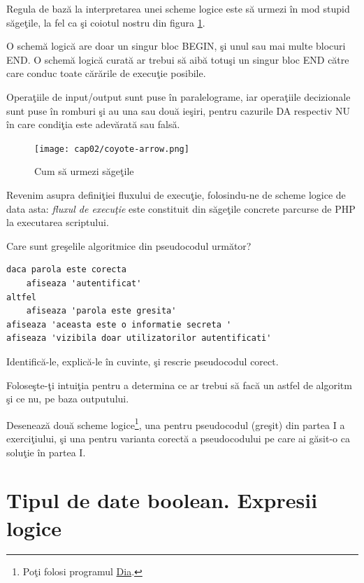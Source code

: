 Regula de bază la interpretarea unei scheme logice
este să urmezi în mod stupid săgeţile, la fel ca şi
coiotul nostru din figura \ref{fig:coyote arrow}.

O schemă logică are doar un singur bloc {\glqq}BEGIN{\grqq}, şi unul
sau mai multe blocuri {\glqq}END{\grqq}. O schemă logică curată
ar trebui să aibă totuşi un singur bloc {\glqq}END{\grqq}
către care conduc toate {\glqq}cărările{\grqq} de execuţie posibile.

Operaţiile de input/output sunt puse în paralelograme,
iar operaţiile decizionale sunt puse în romburi şi au
una sau două ieşiri, pentru cazurile {\glqq}DA{\grqq} respectiv {\glqq}NU{\grqq}
în care condiţia este adevărată sau falsă.

\begin{figure}[ht!]
  \centering
    \texttt{[image: cap02/coyote-arrow.png]}
  \caption{Cum să urmezi săgeţile}
  \label{fig:coyote arrow}
\end{figure}

Revenim asupra definiţiei fluxului de execuţie, folosindu-ne de scheme logice de data asta:
\textit{fluxul de execuţie} este constituit din săgeţile concrete parcurse de PHP
la executarea scriptului.

\begin{Exercise}[difficulty=2,title={Găseşte eroarea de logică}]
\ExePart
Care sunt greşelile algoritmice din pseudocodul următor?

\begin{lstlisting}[language=pseudocod]
daca parola este corecta
	afiseaza 'autentificat'
altfel
	afiseaza 'parola este gresita'
afiseaza 'aceasta este o informatie secreta '
afiseaza 'vizibila doar utilizatorilor autentificati'
\end{lstlisting}

Identifică-le, explică-le în cuvinte, şi rescrie pseudocodul corect.

Foloseşte-ţi intuiţia pentru a determina ce ar trebui
să facă un astfel de algoritm şi ce nu, pe baza outputului.

\ExePart
Desenează două scheme logice\footnote{Poţi folosi programul
\href{http://projects.gnome.org/dia/}{Dia}.}, una pentru pseudocodul (greşit)
din partea I a exerciţiului, şi una pentru varianta corectă
a pseudocodului pe care ai găsit-o ca soluţie în partea I.
\end{Exercise}


\section{Tipul de date boolean. Expresii logice}
\label{sec:tipul de date boolean. Expresii logice}

